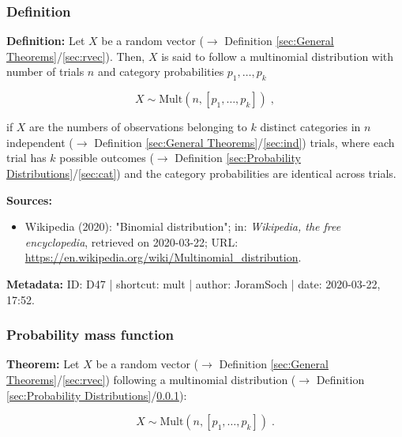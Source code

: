 \documentclass[a4paper,12pt,twoside]{book}
\begin{document}
\subsubsection[\textit{Definition}]{Definition} \label{sec:mult}
\setcounter{equation}{0}

\textbf{Definition:} Let $X$ be a random vector ($\rightarrow$ Definition \ref{sec:General Theorems}/\ref{sec:rvec}). Then, $X$ is said to follow a multinomial distribution with number of trials $n$ and category probabilities $p_1, \ldots, p_k$

\begin{equation} \label{eq:mult-mult}
X \sim \mathrm{Mult}(n, \left[p_1, \ldots, p_k \right]) \; ,
\end{equation}

if $X$ are the numbers of observations belonging to $k$ distinct categories in $n$ independent ($\rightarrow$ Definition \ref{sec:General Theorems}/\ref{sec:ind}) trials, where each trial has $k$ possible outcomes ($\rightarrow$ Definition \ref{sec:Probability Distributions}/\ref{sec:cat}) and the category probabilities are identical across trials.


\vspace{1em}
\textbf{Sources:}
\begin{itemize}
\item Wikipedia (2020): "Binomial distribution"; in: \textit{Wikipedia, the free encyclopedia}, retrieved on 2020-03-22; URL: \url{https://en.wikipedia.org/wiki/Multinomial_distribution}.
\end{itemize}


\vspace{1em}
\textbf{Metadata:} ID: D47 | shortcut: mult | author: JoramSoch | date: 2020-03-22, 17:52.
\vspace{1em}



\subsubsection[\textbf{Probability mass function}]{Probability mass function} \label{sec:mult-pmf}
\setcounter{equation}{0}

\textbf{Theorem:} Let $X$ be a random vector ($\rightarrow$ Definition \ref{sec:General Theorems}/\ref{sec:rvec}) following a multinomial distribution ($\rightarrow$ Definition \ref{sec:Probability Distributions}/\ref{sec:mult}):

\begin{equation} \label{eq:mult-pmf-mult}
X \sim \mathrm{Mult}(n, \left[p_1, \ldots, p_k \right]) \; .
\end{equation}
\end{document}
